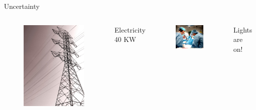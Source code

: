 \begin{frame}{Uncertainty }
\begin{columns}
\pause
{}
\begin{figure}[ht]
\includegraphics[width=\textwidth]{images/electricity}
\end{figure}
Electricity \\ 40 KW

\pause
{}
\begin{figure}[ht]
\includegraphics[width=\textwidth]{images/surgery}
\end{figure}
Lights are on!

\end{columns}
\end{frame}


